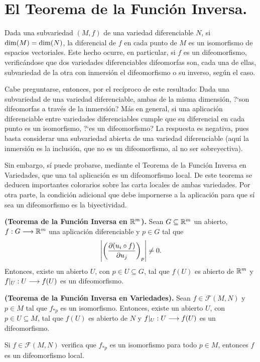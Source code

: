 \documentclass[cursovd_portada.tex]{subfiles}
\begin{document}
\section{El Teorema de la Función Inversa.}
\hs Dada una subvariedad $(M,f)$ de una variedad diferenciable
$N$, si ${\rm dim}(M)={\rm dim}(N)$, la diferencial de $f$ en cada
punto de $M$ es un isomorfismo de espacios vectoriales. Este hecho
ocurre, en particular, si $f$ es un difeomorfismo,
verificándose que dos variedades diferenciables difeomorfas
son, cada una de ellas, subvariedad de la otra con inmersión
el difeomorfismo o su inverso, según el caso.
\par Cabe preguntarse, entonces, por el recíproco de este resultado: Dada una subvariedad de una variedad
diferenciable, ambas de la misma dimensión, ?`son difeomorfas
a través de la inmersión? Más en general, si una
aplicación diferenciable entre variedades diferenciables
cumple que su diferencial en cada punto es un isomorfismo, ?`es un
difeomorfismo? La respuesta es negativa, pues basta considerar una
subvariedad abierta de una variedad diferenciable (aquí la
inmersión es la inclusión, que no es un difeomorfismo, al
no ser sobreyectiva).
\par Sin embargo, sí puede probarse, mediante el Teorema de la Función Inversa en Variedades, que una tal aplicación
es un difeomorfismo local. De este teorema se deducen importantes
colorarios sobre las carta locales de ambas variedades. Por otra
parte, la condición adicional que debe impornerse a la
aplicación para que sí sea un difeomorfismo es la
biyectividad.
\begin{teorema}
{\bf (Teorema de la Función Inversa en $\mathbb{R}^m$).} Sean
$G\subseteq\mathbb{R}^m$ un abierto, $f:G\longrightarrow\mathbb{R}^m$ una aplicación
diferenciable y $p\in G$ tal que
$$\left|\left(\displaystyle{\frac{\partial (u_i\circ f)}{\partial u_j}}\right)_{p}\right|\neq 0.$$
Entonces, existe un abierto $U$, con $p\in U\subseteq G$, tal que
$f(U)$ es abierto de $\mathbb{R}^m$ y $f|_U:U\longrightarrow f(U)$ es un
difeomorfismo.
\end{teorema}
\begin{teorema}
{\bf (Teorema de la Función Inversa en Variedades).} Sean
$f\in\mathcal{F}(M,N)$ y $p\in M$ tal que $f_{*p}$ es un
isomorfismo. Entonces, existe un abierto $U$, con $p\in U\subseteq
M$, tal que $f(U)$ es abierto de $N$ y $f|_U:U\longrightarrow f(U)$ es un
difeomorfismo.
\end{teorema}
\begin{coro}
Si $f\in\mathcal{F}(M,N)$ verifica que $f_{*p}$ es un isomorfismo
para todo $p\in M$, entonces $f$ es un difeomorfismo local.
\end{coro}
\end{document}
